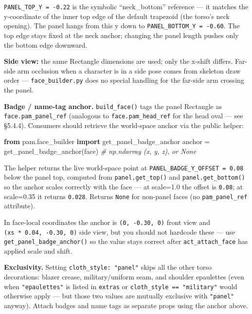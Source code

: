 \documentclass[
  11pt,
]{book}
\newenvironment{Shaded}{}{}
\newcommand{\CommentTok}[1]{\textcolor[rgb]{0.38,0.63,0.69}{\textit{#1}}}
\newcommand{\ImportTok}[1]{\textcolor[rgb]{0.00,0.50,0.00}{\textbf{#1}}}
\newcommand{\NormalTok}[1]{#1}
\newcommand{\OperatorTok}[1]{\textcolor[rgb]{0.40,0.40,0.40}{#1}}
\begin{document}
\texttt{PANEL\_TOP\_Y\ =\ -0.22} is the symbolic ``neck\_bottom''
reference --- it matches the y-coordinate of the inner top edge of the
default trapezoid (the torso's neck opening). The panel hangs from this
y down to \texttt{PANEL\_BOTTOM\_Y\ =\ -0.60}. The top edge stays fixed
at the neck anchor; changing the panel length pushes only the bottom
edge downward.

\textbf{Side view:} the same Rectangle dimensions are used; only the
x-shift differs. Far-side arm occlusion when a character is in a side
pose comes from skeleton draw order --- \texttt{face\_builder.py} does
no special handling for the far-side arm crossing the panel.

\textbf{Badge / name-tag anchor.} \texttt{build\_face()} tags the panel
Rectangle as \texttt{face.pam\_panel\_ref} (analogous to
\texttt{face.pam\_head\_ref} for the head oval --- see §5.4.4).
Consumers should retrieve the world-space anchor via the public helper:

\begin{Shaded}
\begin{Highlighting}[]
\ImportTok{from}\NormalTok{ pam.face\_builder }\ImportTok{import}\NormalTok{ get\_panel\_badge\_anchor}
\NormalTok{anchor }\OperatorTok{=}\NormalTok{ get\_panel\_badge\_anchor(face)   }\CommentTok{\# np.ndarray (x, y, z), or None}
\end{Highlighting}
\end{Shaded}

The helper returns the live world-space point at
\texttt{PANEL\_BADGE\_Y\_OFFSET\ =\ 0.08} below the panel top, computed
from \texttt{panel.get\_top()} and \texttt{panel.get\_bottom()} so the
anchor scales correctly with the face --- at scale=1.0 the offset is
\texttt{0.08}; at scale=0.35 it returns \texttt{0.028}. Returns
\texttt{None} for non-panel faces (no \texttt{pam\_panel\_ref}
attribute).

In face-local coordinates the anchor is \texttt{(0,\ -0.30,\ 0)} front
view and \texttt{(xs\ *\ 0.04,\ -0.30,\ 0)} side view, but you should
not hardcode these --- use \texttt{get\_panel\_badge\_anchor()} so the
value stays correct after \texttt{act\_attach\_face} has applied scale
and shift.

\textbf{Exclusivity.} Setting \texttt{cloth\_style:\ "panel"} skips all
the other torso decorations: blazer crease, military/uniform seam, and
shoulder epaulettes (even when \texttt{"epaulettes"} is listed in
\texttt{extras} or \texttt{cloth\_style\ ==\ "military"} would otherwise
apply --- but those two values are mutually exclusive with
\texttt{"panel"} anyway). Attach badges and name tags as separate props
using the anchor above.
\end{document}
